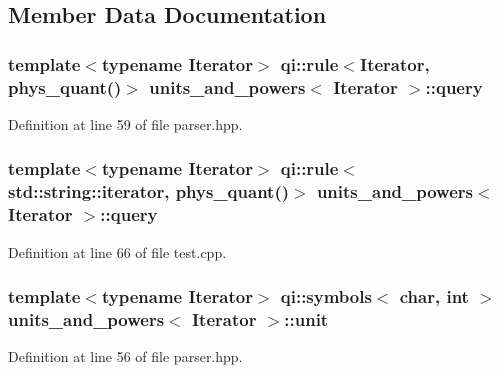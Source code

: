 \subsection{Member Data Documentation}
\subsubsection[{\texorpdfstring{query}{query}}]{\setlength{\rightskip}{0pt plus 5cm}template$<$typename Iterator$>$ qi\+::rule$<$Iterator, {\bf phys\+\_\+quant}()$>$ {\bf units\+\_\+and\+\_\+powers}$<$ Iterator $>$\+::query}\hypertarget{structunits__and__powers_a9a88ef937627d35522c4017b9efd59ba}{}\label{structunits__and__powers_a9a88ef937627d35522c4017b9efd59ba}


Definition at line 59 of file parser.\+hpp.

\subsubsection[{\texorpdfstring{query}{query}}]{\setlength{\rightskip}{0pt plus 5cm}template$<$typename Iterator$>$ qi\+::rule$<$std\+::string\+::iterator, {\bf phys\+\_\+quant}()$>$ {\bf units\+\_\+and\+\_\+powers}$<$ Iterator $>$\+::query}\hypertarget{structunits__and__powers_a1c6b2c6fb390a9c092143ba650add70d}{}\label{structunits__and__powers_a1c6b2c6fb390a9c092143ba650add70d}


Definition at line 66 of file test.\+cpp.

\subsubsection[{\texorpdfstring{unit}{unit}}]{\setlength{\rightskip}{0pt plus 5cm}template$<$typename Iterator$>$ qi\+::symbols$<$ char, int $>$ {\bf units\+\_\+and\+\_\+powers}$<$ Iterator $>$\+::unit}\hypertarget{structunits__and__powers_a83c10d174beef086f2d95070784cde1e}{}\label{structunits__and__powers_a83c10d174beef086f2d95070784cde1e}


Definition at line 56 of file parser.\+hpp.

